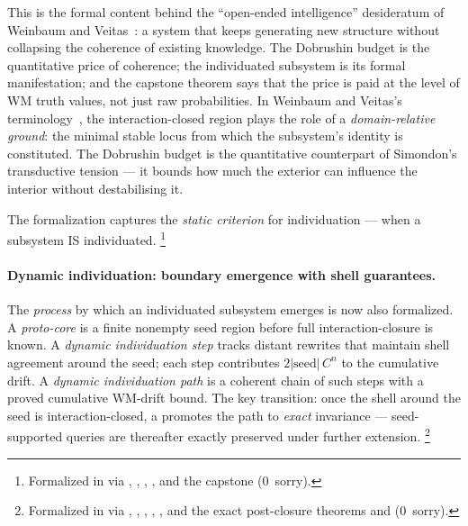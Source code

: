 \documentclass[11pt,openany]{report}
\begin{document}
\noindent
This is the formal content behind the ``open-ended intelligence''
desideratum of Weinbaum and Veitas~\cite{WeinbaumVeitas2015}: a system that
keeps generating new structure without collapsing the coherence of existing
knowledge.  The Dobrushin budget is the quantitative price of coherence;
the individuated subsystem is its formal manifestation; and the capstone
theorem says that the price is paid at the level of WM truth values, not just
raw probabilities.
In Weinbaum and Veitas's terminology~\cite{WeinbaumVeitas2015}, the
interaction-closed region plays the role of a \emph{domain-relative ground}:
the minimal stable locus from which the subsystem's identity is constituted.
The Dobrushin budget is the quantitative counterpart of Simondon's
transductive tension --- it bounds how much the exterior can influence the
interior without destabilising it.

The formalization captures the \emph{static criterion} for individuation ---
when a subsystem IS individuated.%
\footnote{Formalized in
via , ,
,
, and the capstone
 (0~sorry).}

\paragraph{Dynamic individuation: boundary emergence with shell guarantees.}

The \emph{process} by which an individuated subsystem emerges is now
also formalized.  A \emph{proto-core} is a finite nonempty seed region before
full interaction-closure is known.  A \emph{dynamic individuation step}
tracks distant rewrites that maintain shell agreement around the seed; each
step contributes $2|\mathrm{seed}|\,C^n$ to the cumulative drift.  A
\emph{dynamic individuation path} is a coherent chain of such steps with a
proved cumulative WM-drift bound.  The key transition: once the shell around
the seed is interaction-closed, a 
promotes the path to \emph{exact} invariance --- seed-supported queries
are thereafter exactly preserved under further extension.%
\footnote{Formalized in
via , ,
,
,
, and the exact post-closure
theorems  and
 (0~sorry).}
\end{document}
